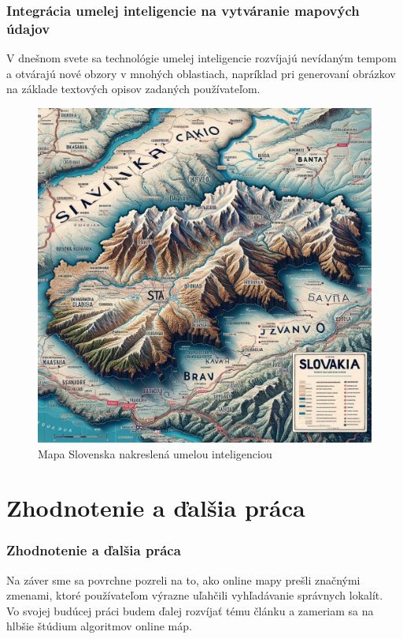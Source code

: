 \documentclass{beamer}
\begin{document}
\begin{frame}[fragile=singleslide]\frametitle{Integrácia umelej inteligencie na vytváranie mapových údajov}
V dnešnom svete sa technológie umelej inteligencie rozvíjajú nevídaným tempom a otvárajú nové obzory v mnohých oblastiach, napríklad pri generovaní obrázkov na základe textových opisov zadaných používateľom. 
	\begin{figure}[h]
		\centering
		\includegraphics[scale=0.12]{image6.png}
		\caption{Mapa Slovenska nakreslená umelou inteligenciou}
		\label{fig:ai}
	\end{figure}
\end{frame}

\section*{Zhodnotenie a ďalšia práca}

\begin{frame}[fragile=singleslide]\frametitle{Zhodnotenie a ďalšia práca}
Na záver sme sa povrchne pozreli na to, ako online mapy prešli značnými zmenami, ktoré používateľom výrazne uľahčili vyhľadávanie správnych lokalít. 
\\Vo svojej budúcej práci budem ďalej rozvíjať tému článku a zameriam sa na hlbšie štúdium algoritmov online máp. 
\end{frame}
\end{document}
